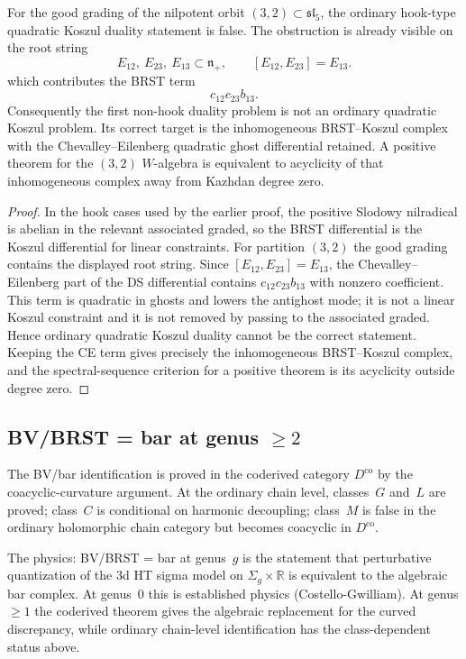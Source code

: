 \documentclass[11pt]{article}
\newcommand{\fn}{\mathfrak{n}}
\newcommand{\bR}{\mathbb{R}}
\begin{document}
\begin{theorem}
\label{thm:sl5-32-decisive-nonhook-computation}
For the good grading of the nilpotent orbit $(3,2)\subset
\mathfrak{sl}_5$, the ordinary hook-type quadratic Koszul
duality statement is false.  The obstruction is already visible on
the root string
\[
  E_{12},\ E_{23},\ E_{13}\subset\fn_+,\qquad
  [E_{12},E_{23}]=E_{13}.
\]
which contributes the BRST term
\[
  c_{12}c_{23}b_{13}.
\]
Consequently the first non-hook duality problem is not an ordinary
quadratic Koszul problem.  Its correct target is the inhomogeneous
BRST--Koszul complex with the Chevalley--Eilenberg quadratic ghost
differential retained.  A positive theorem for the $(3,2)$
$W$-algebra is equivalent to acyclicity of that inhomogeneous
complex away from Kazhdan degree zero.
\end{theorem}

\begin{proof}
In the hook cases used by the earlier proof, the positive
Slodowy nilradical is abelian in the relevant associated graded,
so the BRST differential is the Koszul differential for linear
constraints.  For partition $(3,2)$ the good grading contains the
displayed root string.  Since $[E_{12},E_{23}]=E_{13}$, the
Chevalley--Eilenberg part of the DS differential contains
$c_{12}c_{23}b_{13}$ with nonzero coefficient.  This term is
quadratic in ghosts and lowers the antighost mode; it is not a
linear Koszul constraint and it is not removed by passing to the
associated graded.  Hence ordinary quadratic Koszul duality cannot
be the correct statement.  Keeping the CE term gives precisely the
inhomogeneous BRST--Koszul complex, and the spectral-sequence
criterion for a positive theorem is its acyclicity outside degree
zero.
\end{proof}

\subsection{BV/BRST = bar at genus $\geq 2$}

The BV/bar identification is proved in the coderived category
$D^{\mathrm{co}}$ by the coacyclic-curvature argument.  At the
ordinary chain level, classes~$G$ and~$L$ are proved; class~$C$
is conditional on harmonic decoupling; class~$M$ is false in the
ordinary holomorphic chain category but becomes coacyclic in
$D^{\mathrm{co}}$.

The physics: BV/BRST = bar at genus~$g$ is the statement that
perturbative quantization of the 3d HT sigma model on
$\Sigma_g \times \bR$ is equivalent to the algebraic bar complex.
At genus~$0$ this is established physics (Costello-Gwilliam).  At
genus $\geq 1$ the coderived theorem gives the algebraic
replacement for the curved discrepancy, while ordinary chain-level
identification has the class-dependent status above.
\end{document}
